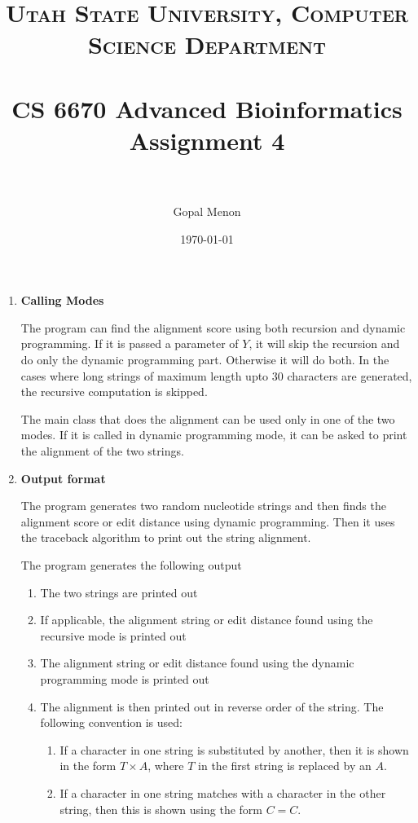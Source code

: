 \documentclass[paper=a4, fontsize=11pt]{scrartcl} %
\title{	
\normalfont \normalsize 
\textsc{Utah State University, Computer Science Department} \\ [25pt] %
\horrule{0.5pt} \\[0.4cm] %
\huge CS 6670 Advanced Bioinformatics\\Assignment 4 \\ %
\horrule{2pt} \\[0.5cm] %
}
\author{Gopal Menon} %
\date{\normalsize\today} %
\numberwithin{equation}{section} %
\numberwithin{figure}{section} %
\numberwithin{table}{section} %
\begin{document}
\maketitle %

\begin{enumerate}

\item \textbf{Calling Modes}

The program can find the alignment score using both recursion and dynamic programming. If it is passed a parameter of $Y$, it will skip the recursion and do only the dynamic programming part. Otherwise it will do both. In the cases where long strings of maximum length upto $30$ characters are generated, the recursive computation is skipped.

The main class that does the alignment can be used only in one of the two modes. If it is called in dynamic programming mode, it can be asked to print the alignment of the two strings.

\item \textbf{Output format}

The program generates two random nucleotide strings and then finds the alignment score or edit distance using dynamic programming. Then it uses the traceback algorithm to print out the string alignment.

The program generates the following output

\begin{enumerate}

\item The two strings are printed out

\item If applicable, the alignment string or edit distance found using the recursive mode is printed out

\item The alignment string or edit distance found using the dynamic programming mode is printed out

\item The alignment is then printed out in reverse order of the string. The following convention is used:

\begin{enumerate}

\item If a character in one string is substituted by another, then it is shown in the form $T \times A$, where $T$ in the first string is replaced by an $A$.
 
 \item If a character in one string matches with a character in the other string, then this is shown using the form $C = C$.
 

\end{enumerate}
\end{enumerate}
\end{enumerate}
\end{document}
